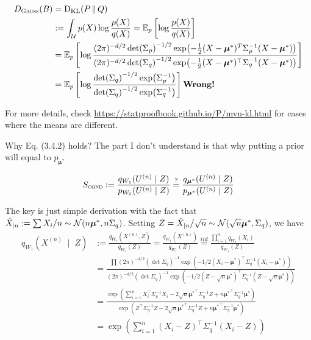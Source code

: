 \begin{align*}
	D_{\textsc{Gauss}}(B) & = \KL{P}{Q}                                                                                                             \\
	                      & := \int_{\Uc} p(X) \log \frac{p(X)}{q(X)}
	= \ERWi{p}{\log\frac{p(X)}{q(X)}}                                                                                                               \\
	                      & = \ERWi{p}{\log\frac{(2\pi)^{-d/2} \det(\Sigma_p)^{-1/2}\exp(-\frac{1}{2}(X-\bm{\mu}^*)^T \Sigma_p^{-1}(X-\bm{\mu}^*))}
	{(2\pi)^{-d/2} \det(\Sigma_q)^{-1/2}\exp(-\frac{1}{2}(X-\bm{\mu}^*)^\top \Sigma_q^{-1}(X-\bm{\mu}^*))}}                                         \\
	                      & = \ERWi{p}{\log\frac{\det(\Sigma_q)^{-1/2} \exp(\Sigma_p^{-1})}{\det(\Sigma_q)^{-1/2}\exp(\Sigma_q^{-1})}} \qq{Wrong!}
\end{align*}

For more details, check \url{https://statproofbook.github.io/P/mvn-kl.html} for cases where the means are different.

Why Eq. (3.4.2) holds? The part I don't understand is that
why putting a prior will equal to $p_{\bm{\mu}^*}$

\begin{align*}
	S_{\textsc{cond}} := \frac{q_{W_1}(U^{(n)} \;|\; Z)}{p_{W_0}(U^{(n)} \;|\; Z)}
	\stackrel{?}{=} \frac{q_{\bm{\mu}^*}(U^{(n)} \;|\; Z)}{p_{\bm{\mu}^*}(U^{(n)} \;|\; Z)}
\end{align*}

The key is just simple derivation with the fact that $\hat{X}_{|n}:=\sum X_i/n \sim \mathcal{N}(n\bm{\mu}^*,n\Sigma_q)$.
Setting $Z=\hat{X}_{|n}/\sqrt{n} \sim \mathcal{N}(\sqrt{n}\bm{\mu}^*,\Sigma_q)$, we have
\begin{align*}
	q_{W_1}(X^{(n)} \;\mid\; Z) & := \frac{q_{W_1}(X^{(n)}, Z)}{q_{W_1}(Z)} = \frac{q_{W_1}(X^{(n)})}{q_{W_1}(Z)}
	\stackrel{iid}{=} \frac{\prod^n_{i=1}q_{W_1}(X_i)}{q_{W_1}(Z)}                                                                                  \\
	                            & = \frac{\prod(2\pi)^{-d/2}(\det \Sigma_q)^{-1} \exp(-1/2 (X_i-\bm{\mu}^*)^\top \Sigma_q^{-1} (X_i - \bm{\mu}^*))}
	{(2\pi)^{-d/2}(\det \Sigma_q)^{-1} \exp(-1/2(Z -\sqrt{n} \bm{\mu}^*)^\top \Sigma_q^{-1} (Z -\sqrt{n} \bm{\mu}^*))}                              \\
	                            & = \frac{\exp(\sum_{i=1}^n X_i^\top\Sigma_q^{-1}X_i - 2 \sqrt{n}{\bm{\mu}^*}^\top\Sigma_q^{-1}Z
		+ n {\bm{\mu}^*}^\top \Sigma_q^{-1}\bm{\mu}^*)}
	{\exp(Z^\top\Sigma_q^{-1}Z - 2 \sqrt{n}{\bm{\mu}^*}^\top\Sigma_q^{-1}Z
	+ n {\bm{\mu}^*}^\top \Sigma_q^{-1}\bm{\mu}^*)}                                                                                                 \\
	                            & = \exp(\sum_{i=1}^n (X_i - Z)^\top \Sigma_q^{-1} (X_i - Z))
\end{align*}

